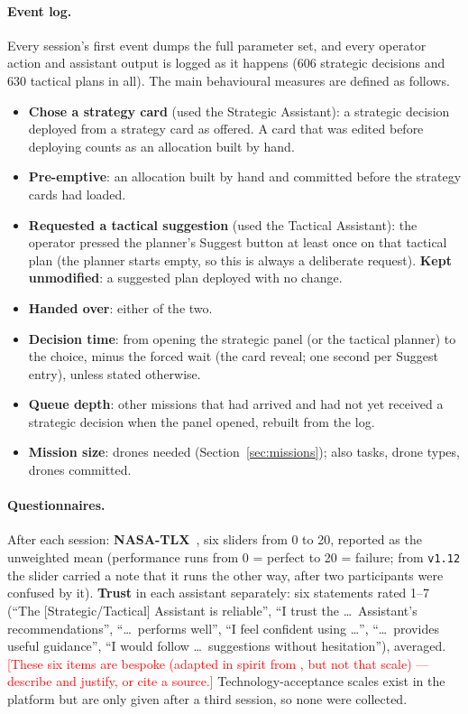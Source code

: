 \documentclass[10pt]{article}
\theoremstyle{definition}
\newcommand{\todo}[1]{\textcolor{red}{[#1]}}
\begin{document}
\paragraph{Event log.} Every session's first event dumps the full parameter set, and every operator action and
assistant output is logged as it happens (606 strategic decisions and 630 tactical plans in all). The main
behavioural measures are defined as follows.
\begin{itemize}[noitemsep]
  \item \textbf{Chose a strategy card} (used the Strategic Assistant): a strategic decision deployed from a strategy
        card as offered. A card that was edited before deploying counts as an allocation built by hand.
  \item \textbf{Pre-emptive}: an allocation built by hand and committed before the strategy cards had loaded.
  \item \textbf{Requested a tactical suggestion} (used the Tactical Assistant): the operator pressed the planner's
        Suggest button at least once on that tactical plan (the planner starts empty, so this is always a deliberate
        request). \textbf{Kept unmodified}: a suggested plan deployed with no change.
  \item \textbf{Handed over}: either of the two.
  \item \textbf{Decision time}: from opening the strategic panel (or the tactical planner) to the choice, minus the
        forced wait (the card reveal; one second per Suggest entry), unless stated otherwise.
  \item \textbf{Queue depth}: other missions that had arrived and had not yet received a strategic decision when the
        panel opened, rebuilt from the log.
  \item \textbf{Mission size}: drones needed (Section~\ref{sec:missions}); also tasks, drone types, drones committed.
\end{itemize}

\paragraph{Questionnaires.} After each session: \textbf{NASA-TLX}~\cite{hart1988nasa}, six sliders from 0 to 20,
reported as the unweighted mean (performance runs from 0 = perfect to 20 = failure; from \texttt{v1.12} the slider
carried a note that it runs the other way, after two participants were confused by it). \textbf{Trust} in each
assistant separately: six statements rated 1--7 (``The [Strategic/Tactical] Assistant is reliable'', ``I trust the
\dots\ Assistant's recommendations'', ``\dots\ performs well'', ``I feel confident using \dots'', ``\dots\ provides
useful guidance'', ``I would follow \dots\ suggestions without hesitation''), averaged. \todo{These six items are
bespoke (adapted in spirit from \cite{jian2000foundations}, but not that scale) --- describe and justify, or cite a
source.} Technology-acceptance scales exist in the platform but are only given after a third session, so none were
collected.
\end{document}
